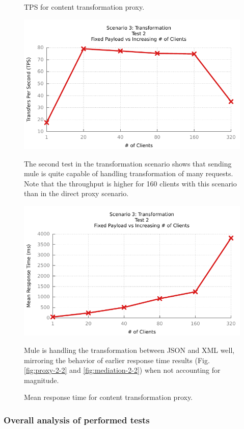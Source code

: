 \begin{figure}[H]
	\caption{TPS for content transformation proxy.}
	\centerline{\includegraphics{img/transform_fp_iu_tps}}
	\label{fig:transform-2-1}
	The second test in the transformation scenario shows that sending mule is quite capable of handling transformation of many requests. Note that the throughput is higher for 160 clients with this scenario than in the direct proxy scenario.

	\caption{Mean response time for content transformation proxy.}
	\centerline{\includegraphics{img/transform_fp_iu_resp}}
	\label{fig:transform-2-2}
	Mule is handling the transformation between JSON and XML well, mirroring the behavior of earlier response time results (Fig. \ref{fig:proxy-2-2} and \ref{fig:mediation-2-2}) when not accounting for magnitude.
\end{figure}

\subsubsection{Overall analysis of performed tests}
\label{sec:test-final-analysis}

